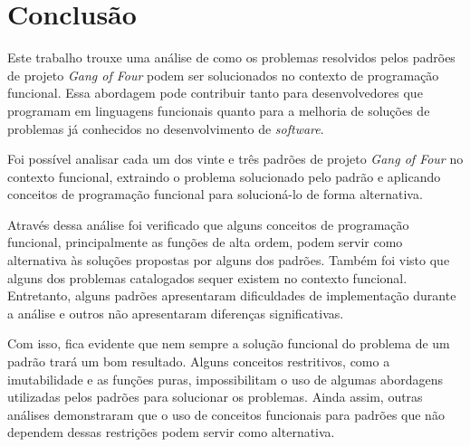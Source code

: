 \chapter{Conclusão}


Este trabalho trouxe uma análise de como os 
problemas resolvidos pelos padrões de projeto 
\textit{Gang of Four} podem ser solucionados no 
contexto de programação funcional. Essa abordagem 
pode contribuir tanto para desenvolvedores que 
programam em linguagens funcionais quanto para a 
melhoria de soluções de problemas já conhecidos 
no desenvolvimento de \textit{software}.


Foi possível analisar cada um dos vinte e 
três padrões de projeto \textit{Gang of Four} 
no contexto funcional, extraindo o problema 
solucionado pelo padrão e aplicando conceitos 
de programação funcional para solucioná-lo de 
forma alternativa.


Através dessa análise foi verificado que 
alguns conceitos de programação funcional, 
principalmente as funções de alta 
ordem, podem servir como alternativa às soluções 
propostas por alguns dos padrões. Também foi 
visto que alguns dos problemas catalogados 
sequer existem no contexto funcional. 
Entretanto, alguns padrões apresentaram 
dificuldades de implementação durante a 
análise e outros não apresentaram diferenças 
significativas.


Com isso, fica evidente que nem sempre 
a solução funcional do problema de um 
padrão trará um bom resultado. Alguns 
conceitos restritivos, como a imutabilidade 
e as funções puras, impossibilitam 
o uso de algumas abordagens utilizadas 
pelos padrões para solucionar os problemas. 
Ainda assim, outras análises demonstraram 
que o uso de conceitos funcionais para 
padrões que não dependem dessas restrições 
podem servir como alternativa. 



